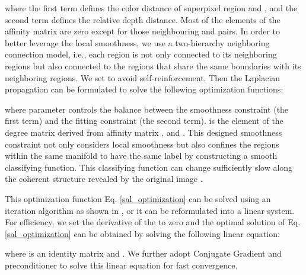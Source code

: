 \documentclass[journal]{IEEEtran}
\begin{document}
where the first term defines the color distance of superpixel region  and , and the second term defines the relative depth distance. Most of the elements of the affinity matrix  are zero except for those neighbouring  and  pairs. In order to better leverage the local smoothness, we use a two-hierarchy neighboring connection model, i.e., each region is not only connected to its neighboring regions but also connected to the regions that share the same boundaries with its neighboring regions. We set  to avoid self-reinforcement.
Then the Laplacian propagation can be formulated to solve the following optimization functions:


where parameter  controls the balance between the smoothness constraint (the first term) and the fitting constraint (the second term).  is the element of the degree matrix  derived from affinity matrix , and .
This designed smoothness constraint not only considers local smoothness but also confines the regions within the same manifold to have the same label by
constructing a smooth classifying function. This classifying function can change sufficiently slow along the coherent structure revealed by the original image \cite{zhou2004learning}.

This optimization function Eq. \ref{sal_optimization} can be solved using an iteration algorithm as shown in \cite{zhou2004learning}, or it can be reformulated into a linear system. For efficiency, we set the derivative of the  to zero and the optimal solution of Eq. \ref{sal_optimization} can be obtained by solving the following linear equation:

where  is an identity matrix and . We further adopt Conjugate Gradient and  preconditioner to solve this linear equation for fast convergence.
\end{document}
